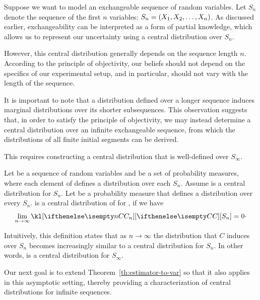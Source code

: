 
Suppose we want to model an exchangeable sequence of random variables.
Let $S_n$ denote the sequence of the first $n$ variables: $S_n = (X_1, X_2, \ldots, X_{n})$.
As discussed earlier, exchangeability can be interpreted as a form of partial knowledge, which allows us to
represent our uncertainty using a central distribution over $S_n$.

However, this central distribution generally depends on the sequence length $n$.
According to the principle of objectivity, our beliefs should not depend on the specifics of our experimental setup,
and in particular, should not vary with the length of the sequence.

It is important to note that a distribution defined over a longer sequence induces marginal distributions over its
shorter subsequences.
This observation suggests that, in order to satisfy the principle of objectivity, we may instead determine a central
distribution over an infinite exchangeable sequence, from which the distributions of all finite initial segments can
be derived.

This requires constructing a central distribution that is well-defined over $S_{\infty}$.

\begin{definition}
    \label{def:infseq-central}
    Let  be a sequence of random variables and \setQ be a set of probability measures,
    where each element of \setQ defines a distribution over each $S_n$.
    Assume \cDist[n] is a central distribution for $S_n$.
    Let \cDist be a probability measure that defines a distribution over every $S_n$.
    \cDist is a central distribution of \setQ for , if we have
    \begin{equation*}
        \toInf \kl[{\cDist[n]}][\cDist][S_n] = 0 \cdot
    \end{equation*}
\end{definition}

Intuitively, this definition states that as $n \to \infty$ the distribution that $C$ induces over $S_n$ becomes
increasingly similar to a central distribution for $S_n$.
In other words, \cDist is a central distribution for $S_{\infty}$.

Our next goal is to extend Theorem~\ref{th:estimator-to-var} so that it also applies in this asymptotic setting,
thereby providing a characterization of central distributions for infinite sequences.

